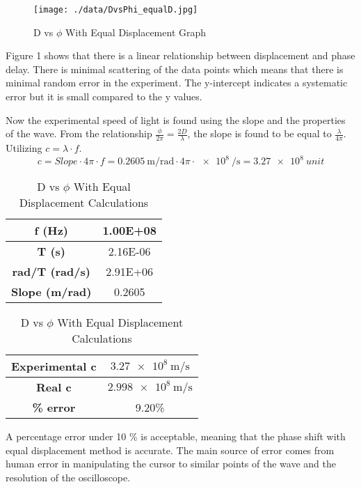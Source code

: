 \documentclass[12pt]{article}
\begin{document}
	\begin{figure}[!h]
		\centering
		\caption{D vs $\phi$ With Equal Displacement Graph}
		\label{DvsPhi_EqualDisplacementGraph}
		\texttt{[image: ./data/DvsPhi\_equalD.jpg]}
	\end{figure}
	
	Figure 1 shows that there is a linear relationship between displacement and phase delay. There is minimal scattering of the data points which means that there is minimal random error in the experiment. The y-intercept indicates a systematic error but it is small compared to the y values.
	
	Now the experimental speed of light is found using the slope and the properties of the wave. From the relationship $ \frac{\phi}{2\pi} = \frac{2D}{\lambda} $, the slope is found to be equal to $\frac{\lambda}{4\pi}$. Utilizing $c=\lambda \cdot f$.
	\[
		c = Slope \cdot 4\pi \cdot f = \qty{0.2605}{\meter\per\radian} \cdot 4\pi \cdot \qty{e8}{\per\second} = \qty{3.27e8}{unit}
	\]
	\begin{table}[!h]
		\centering
		\caption{D vs $\phi$ With Equal Displacement Calculations}
		\label{DvsPhi_EqualDisplacementCalculations}
		\begin{tabular}{|c|c|}
			\hline
			\textbf{f (Hz)} & 1.00E+08 \\
			\hline
			\textbf{T (s)} & 2.16E-06 \\
			\hline
			\textbf{rad/T (rad/s)} & 2.91E+06 \\
			\hline
			\textbf{Slope (m/rad)} & 0.2605 \\
			\hline
		\end{tabular}
		\hfill
		\begin{tabular}{|c|c|}
			\hline
			\textbf{Experimental c} & $\qty{3.27e8}{\meter\per\second}$ \\
			\hline
			\textbf{Real c} & $\qty{2.998e8}{\meter\per\second}$ \\
			\hline
			\textbf{\% error} & 9.20\% \\
			\hline
		\end{tabular}
	\end{table}
	
	A percentage error under 10 \% is acceptable, meaning that the phase shift with equal displacement method is accurate. The main source of error comes from human error in manipulating the cursor to similar points of the wave and the resolution of the oscilloscope.
	
\clearpage
	
	
\end{document}
